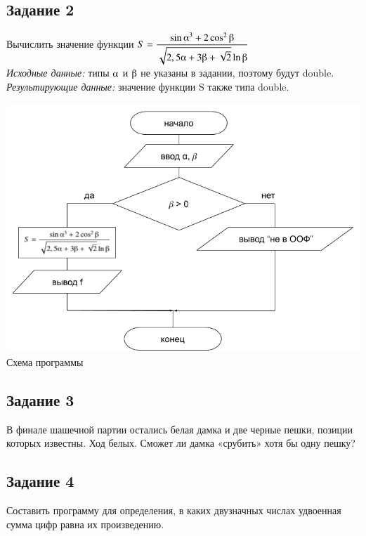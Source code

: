 \documentclass[a4paper,14pt]{extarticle}
\begin{document}
\subsection{Задание 2}
Вычислить значение функции
$S = \displaystyle\frac{ \sin \alphaup^3 + 2\cos^2\betaup }{\sqrt{2,5\alphaup + 3\betaup  + \sqrt{2}}\ln \betaup }$\\
\textit{Исходные данные:} типы $\alphaup$ и $\betaup$ не указаны в задании, поэтому будут double.\\
\textit{Результирующие данные:} значение функции S также типа double.
\vspace{0.5cm}
\begin{center}
\includegraphics[scale=0.6]{lab2-2.png}
Схема программы
\end{center}


\subsection{Задание 3}
В финале шашечной партии остались белая дамка и две черные пешки, позиции которых известны. Ход белых. Сможет ли дамка «срубить» хотя бы одну пешку? 


\subsection{Задание 4}
Составить программу для определения, в каких двузначных числах удвоенная сумма цифр равна их произведению. 

\end{document}
